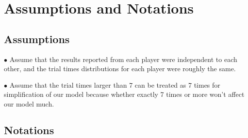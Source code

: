 \section{Assumptions and Notations}
\subsection{Assumptions}
$\bullet$ Assume that the results reported from each player were independent to each other, and the trial times distributions for each player were roughly the same.

$\bullet$ Assume that the trial times larger than 7 can be treated as 7 times for simplification of our model because whether exactly 7 times or more won't affect our model much. 
\subsection{Notations}


